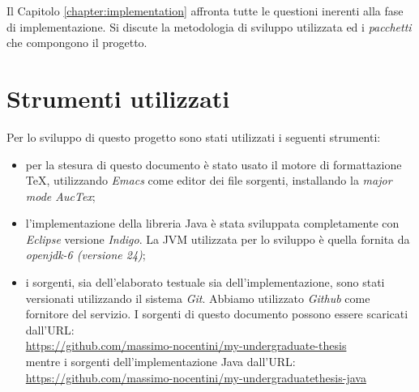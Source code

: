 Il Capitolo \ref{chapter:implementation} affronta tutte le questioni
inerenti alla fase di implementazione. Si discute la metodologia di
sviluppo utilizzata ed i \emph{pacchetti} che compongono il progetto.


\section{Strumenti utilizzati}
\label{section:used-tools}
Per lo sviluppo di questo progetto sono stati utilizzati i seguenti
strumenti:
\begin{itemize}
\item per la stesura di questo documento \`e stato usato il motore di
  formattazione \TeX, utilizzando \emph{Emacs} come editor dei file
  sorgenti, installando la \emph{major mode AucTex};
\item l'implementazione della libreria Java \`e stata sviluppata
  completamente con \emph{Eclipse} versione \emph{Indigo}. La JVM
  utilizzata per lo sviluppo \`e quella fornita da \emph{openjdk-6
    (versione 24)};
\item i sorgenti, sia dell'elaborato testuale sia
  dell'implementazione, sono stati versionati utilizzando il sistema
  \emph{Git}. Abbiamo utilizzato \emph{Github} come fornitore del
  servizio. I sorgenti di questo documento possono essere scaricati
  dall'URL:\\
  \href{https://github.com/massimo-nocentini/my-undergraduate-thesis}{
    https://github.com/massimo-nocentini/my-undergraduate-thesis}\\
  mentre i sorgenti dell'implementazione Java dall'URL:\\
  \href{https://github.com/massimo-nocentini/my-undergraduatethesis-java}{
    https://github.com/massimo-nocentini/my-undergraduatethesis-java}
\end{itemize}